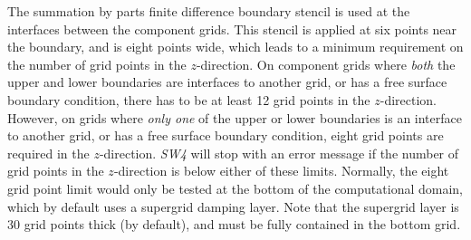 \documentclass[11pt]{report}
\begin{document}
The summation by parts finite difference boundary stencil is used at the interfaces between the
component grids. This stencil is applied at six points near the boundary, and is eight points wide,
which leads to a minimum requirement on the number of grid points in the $z$-direction.  On
component grids where {\em both} the upper and lower boundaries are interfaces to another grid, or
has a free surface boundary condition, there has to be at least 12 grid points in the $z$-direction.
However, on grids where {\em only one} of the upper or lower boundaries is an interface to another
grid, or has a free surface boundary condition, eight grid points are required in the
$z$-direction. \emph{SW4} will stop with an error message if the number of grid points in the
$z$-direction is below either of these limits. Normally, the eight grid point limit would only be
tested at the bottom of the computational domain, which by default uses a supergrid damping
layer. Note that the supergrid layer is 30 grid points thick (by default), and must be fully
contained in the bottom grid.
\end{document}
